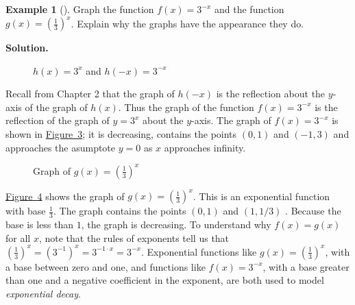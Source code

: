\documentclass[10pt,]{book}
\theoremstyle{plain}
\theoremstyle{definition}
\theoremstyle{definition}
\newtheorem{example}[theorem]{Example}
\theoremstyle{definition}
\numberwithin{equation}{section}
\begin{document}
\begin{example}[]\label{example-14}
\hypertarget{p-235}{}%
Graph the function \(f(x)=3^{-x}\) and the function \(g(x)=(\frac{1}{3})^x\).  Explain why the graphs have the appearance they do.%
\par\smallskip%
\noindent\textbf{Solution.}\hypertarget{solution-14}{}\quad%
\hypertarget{p-236}{}%
\leavevmode%
\begin{figure}
\centering
{
}
\caption{\(h(x) = 3^x\) and \(h(-x) = 3^{-x}\)\label{figure-hreflection-of-3x}}
\end{figure}
 Recall from Chapter 2 that the graph of \(h(-x)\) is the reflection about the \(y\)-axis of the graph of \(h(x)\). Thus the graph of the function \(f(x)=3^{-x}\) is the reflection of the graph of \(y=3^x\) about the \(y\)-axis.  The graph of \(f(x)=3^{-x}\) is shown in \hyperref[figure-hreflection-of-3x]{Figure~3}; it is decreasing, contains the points \((0,1)\) and \((-1,3)\) and approaches the asumptote \(y=0\) as \(x\) approaches infinity. \begin{figure}
\centering
{
}
\caption{Graph of \(g(x)=(\frac{1}{3})^x\)\label{figure-graphofonethirdtothex}}
\end{figure}
 \hyperref[figure-graphofonethirdtothex]{Figure~4} shows the graph of \(g(x)=(\frac{1}{3})^x\). This is an exponential function with base \(\frac{1}{3}\).  The graph contains the points \((0,1)\)  and \((1,1/3)\) .  Because the base is less than \(1\), the graph is decreasing. To understand why \(f(x)=g(x)\) for all \(x\), note that the rules of exponents tell us that  \((\frac{1}{3})^x = ( 3^{-1} )^x = 3^{-1 \cdot x} = 3^{-x}\). Exponential functions like \(g(x)=(\frac{1}{3})^x\), with a base between zero and one, and functions like \(f(x)=3^{-x}\), with a base greater than one and a negative coefficient in the exponent, are both used to model \emph{exponential decay}.%
\end{example}
\end{document}
